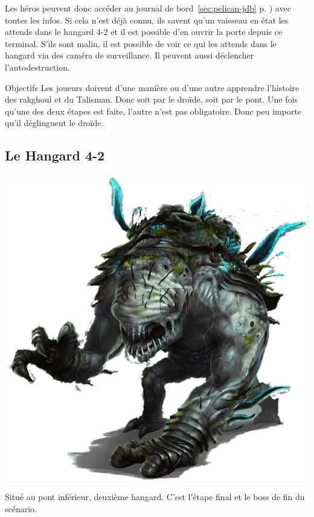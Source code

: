 \documentclass{jdrp}
\begin{document}
Les héros peuvent donc accéder au journal de bord~\ref{sec:pelican-jdb} p. \pageref{sec:pelican-jdb}) avec toutes les infos. Si cela n'est déjà connu, ils savent qu'un vaisseau en état les attends dans le hangard 4-2 et il est possible d'en ouvrir la porte depuis ce terminal. S'ils sont malin, il est possible de voir ce qui les attends dans le hangard via des caméra de surveillance. Il peuvent aussi déclencher l'autodestruction.

\begin{paperbox}{Objectifs}
Les joueurs doivent d'une manière ou d'une autre apprendre l'histoire des rakghoul et du Talisman. Donc soit par le droïde, soit par le pont. Une fois qu'une des deux étapes est faite, l'autre n'est pas obligatoire. Donc peu importe qu'il déglinguent le droïde.
\end{paperbox}

\subsection{Le Hangard 4-2}

\noindent\includegraphics[width=\linewidth]{img/scenario/rakghoul-amblyope.png}

Situé au pont inférieur, deuxième hangard. C'est l'étape final et le boss de fin du scénario.
\end{document}
